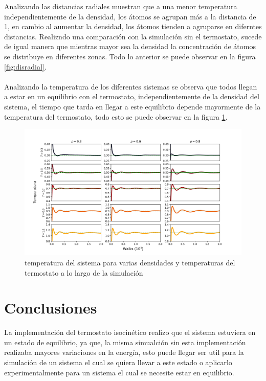 \documentclass[reprint,amsmath,amssymb,aps,]{revtex4-2}
\begin{document}
Analizando las distancias radiales muestran que a una menor temperatura independientemente de la densidad, los átomos se agrupan más a la distancia de 1, en cambio
al aumentar la densidad, los átomos tienden a agruparse en diferntes distancias.
Realizndo una comparación con la simulación sin el termostato, sucede de igual manera que mientras mayor sea la densidad
la concentración de átomos se distribuye en diferentes zonas. Todo lo anterior se puede observar en la figura \ref{fig:disradial}.\\\\

Analizando la temperatura de los diferentes sistemas se observa que todos llegan a estar en un equilibrio con el termostato, independientemente
de la densidad del sistema, el tiempo que tarda en llegar a este equilibrio depende mayormente de la temperatura del termostato, todo esto se puede observar
en la figura \ref{fig:temp}.
\begin{figure}[H]
    \hspace{-0.75cm}
    \includegraphics[scale=0.275]{../Graphics/Temp.png}
    \caption{temperatura del sistema para varias densidades y temperaturas del termostato a lo largo de la simulación}
    \label{fig:temp}
    \end{figure}
\section{Conclusiones}
La implementación del termostato isocinético realizo que el sistema estuviera en un estado de equilibrio, ya que, la misma simualción sin esta implementación
realizaba mayores variaciones en la energía, esto puede llegar ser util para la simulación de un sistema el cual se quiera llevar a este estado o aplicarlo experimentalmente
para un sistema el cual se necesite estar en equilibrio.
\end{document}
